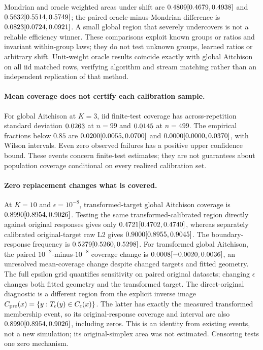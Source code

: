 Mondrian and oracle weighted areas under shift are $0.4809 [0.4679, 0.4938]{}$ and $0.5632 [0.5514, 0.5749]{}$; the paired oracle-minus-Mondrian difference is $0.0823 [0.0724, 0.0921]{}$. A small global region that severely undercovers is not a reliable efficiency winner. These comparisons exploit known groups or ratios and invariant within-group laws; they do not test unknown groups, learned ratios or arbitrary shift. Unit-weight oracle results coincide exactly with global Aitchison on all iid matched rows, verifying algorithm and stream matching rather than an independent replication of that method.

\paragraph{Mean coverage does not certify each calibration sample.}
For global Aitchison at $K=3$, iid finite-test coverage has across-repetition standard deviation $0.0263{}$ at $n=99$ and $0.0145{}$ at $n=499$. The empirical fractions below $0.85$ are $0.0200 [0.0055, 0.0700]{}$ and $0.0000 [0.0000, 0.0370]{}$, with Wilson intervals. Even zero observed failures has a positive upper confidence bound. These events concern finite-test estimates; they are not guarantees about population coverage conditional on every realized calibration set.

\paragraph{Zero replacement changes what is covered.}
At $K=10$ and $\epsilon=10^{-8}$, transformed-target global Aitchison coverage is $0.8990 [0.8954, 0.9026]{}$. Testing the same transformed-calibrated region directly against original responses gives only $0.4721 [0.4702, 0.4740]{}$, whereas separately calibrated original-target raw L2 gives $0.9000 [0.8955, 0.9045]{}$. The boundary-response frequency is $0.5279 [0.5260, 0.5298]{}$. For transformed global Aitchison, the paired $10^{-2}$-minus-$10^{-8}$ coverage change is $0.0008 [-0.0020, 0.0036]{}$, an unresolved mean-coverage change despite changed targets and fitted geometry. The full epsilon grid quantifies sensitivity on paired original datasets; changing $\epsilon$ changes both fitted geometry and the transformed target. The direct-original diagnostic is a different region from the explicit inverse image $C_{\rm pre}(x)=\{y:T_\epsilon(y)\in C_\epsilon(x)\}$. The latter has exactly the measured transformed membership event, so its original-response coverage and interval are also $0.8990 [0.8954, 0.9026]{}$, including zeros. This is an identity from existing events, not a new simulation; its original-simplex area was not estimated. Censoring tests one zero mechanism.

